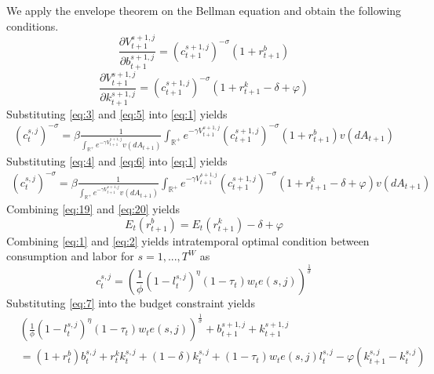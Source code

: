 \documentclass[12pt]{article}
\begin{document}
We apply the envelope theorem on the Bellman equation and obtain the following conditions.
\begin{equation}
\frac{\partial V_{t+1}^{s+1,j}}{\partial b_{t+1}^{s+1,j}} = (c_{t+1}^{s+1,j})^{-\sigma}(1+r_{t+1}^b) \label{eq:5}
\end{equation}
\begin{equation}
\frac{\partial V_{t+1}^{s+1,j}}{\partial k_{t+1}^{s+1,j}} = (c_{t+1}^{s+1,j})^{-\sigma}(1+r^k_{t+1}-\delta+\varphi) \label{eq:6}
\end{equation}
Substituting \eqref{eq:3} and \eqref{eq:5} into \eqref{eq:1} yields
\begin{equation}
\begin{split}
(c_{t}^{s,j})^{-\sigma} = \beta\frac{1}{\int_{\mathbb{R}^+} e^{{-\gamma}{V_{t+1}^{s+1,j}}}v(dA_{t+1})}\int_{\mathbb{R}^+} e^{{-\gamma}{V_{t+1}^{s+1,j}}}(c_{t+1}^{s+1,j})^{-\sigma}(1+r_{t+1}^b)v(dA_{t+1}) \label{eq:19}
\end{split}
\end{equation}
Substituting \eqref{eq:4} and \eqref{eq:6} into \eqref{eq:1} yields
\begin{equation}
\begin{split}
(c_{t}^{s,j})^{-\sigma} = \beta\frac{1}{\int_{\mathbb{R}^+} e^{{-\gamma}{V_{t+1}^{s+1,j}}}v(dA_{t+1})}\int_{\mathbb{R}^+} e^{{-\gamma}{V_{t+1}^{s+1,j}}}(c_{t+1}^{s+1,j})^{-\sigma}(1+r^k_{t+1}-\delta+\varphi)v(dA_{t+1}) \label{eq:20}
\end{split}
\end{equation}
Combining \eqref{eq:19} and \eqref{eq:20} yields
\begin{equation}
	E_t(r_{t+1}^b)=E_t(r^k_{t+1})-\delta+\varphi
\end{equation}
Combining \eqref{eq:1} and \eqref{eq:2} yields intratemporal optimal condition between consumption and labor for $s=1,...,T^W$ as
\begin{equation}
c_{t}^{s,j}=\left(\frac{1}{\phi}(1-l_{t}^{s,j})^{\eta}(1-\tau_t)w_te(s,j)\right)^{\frac{1}{\sigma}} \label{eq:7}
\end{equation}
Substituting \eqref{eq:7} into the budget constraint yields
\begin{equation}
\begin{split} 
\hspace{0em} &\left(\frac{1}{\phi}(1-l_t^{s,j})^{\eta}(1-\tau_t)w_te(s,j)\right)^{\frac{1}{\sigma}}+ b_{t+1}^{s+1,j} + k_{t+1}^{s+1,j}\\
&=(1+r_t^b)b_{t}^{s,j}+r_t^k k_{t}^{s,j}+(1-\delta)k_{t}^{s,j}+(1-\tau_t)w_te(s,j)l_{t}^{s,j}-\varphi(k_{t+1}^{s,j}-k_{t}^{s,j})
\end{split}
\end{equation}
\end{document}
